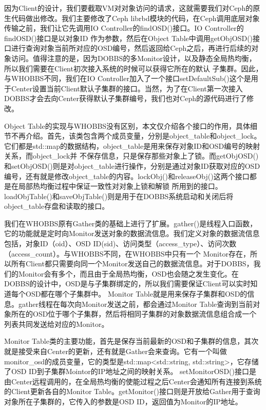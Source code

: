因为Client的设计，我们要截取VM对对象访问的请求，这就需要我们对Ceph的原生代码做出修改。我们主要修改了Ceph librbd模块的代码，在Ceph调用底层对象传输之前，我们让它先调用IO Controller的findOSD()接口。IO Controller的findOSD()接口是以对象ID
作为参数，然后在Object Table中调用getObjOSD()接口进行查询对象当前所对应的OSD编号，然后返回给Ceph之后，再进行后续的对象访问。值得注意的是，因为DOBBS的多Monitor设计，以及静态全局热均衡，所以我们需要在Client初次接入系统的时候可以获得它所在的默认
子集群。因此，与WHOBBS不同，我们在IO Controller加入了一个接口setDefaultSub()这个是用于Center设置当前Client默认子集群的接口。当然，为了在Client第一次接入DOBBS才会去向Center获得默认子集群编号，我们也对Ceph的源代码进行了修改。

Object Table的实现与WHOBBS没有区别，本文仅介绍各个接口的作用，具体细节不再介绍。首先，该类包含两个成员变量，分别是object\_table和object\_lock。它们都是std::map的数据结构，object\_table是用来保存对象ID和OSD编号的映射关系，而object\_lock并
不保存信息，只是保存那些对象上了锁。而getObjOSD()和setObjOSD()则是对object\_table进行操作，分别是通过对象ID获取对应的OSD编号，还有就是修改object\_table的内容。lockObj()和releaseObj()这两个接口都是在局部热均衡过程中保证一致性对对象上锁和解锁
所用到的接口。loadObjTable()和saveObjTable()则是用于在DOBBS系统启动和关闭后将object\_table存盘和读取的接口。

我们在WHOBBS原有Gather类的基础上进行了扩展。gather()是线程入口函数，它的功能就是定时向Monitor发送对象的数据流信息。我们定义对象的数据流信息包括，对象ID（oid）、OSD ID(sid)、访问类型（access\_type）、访问次数（access\_count）。与WHOBBS不同，在WHOBBS中只有一个
Monitor存在，所以所有Client都只需要向同一个Monitor发送自己的数据流信息。对于DOBBS，我们的Monitor会有多个，而且由于全局热均衡，OSD也会随之发生变化。在DOBBS的设计中，OSD是与子集群绑定的，所以我们需要保证Client可以实时知道每个OSD都在哪个子集群中。
Monitor Table就是用来保存子集群和OSD的信息。gather线程在每次向Monitor发送之前，都会通过Monitor Table查询到当前对象所在的OSD位于哪个子集群，然后将相同子集群的对象数据流信息组合成一个列表共同发送给对应的Monitor。

Monitor Table类的主要功能，首先是保存当前最新的OSD和子集群的信息，其次就是接受来自Center的更新，还有就是Gather会来查询。它有一个叫做monitor\_osd的成员变量，它的类型是std::map<std::string, std::string>，它存储了OSD ID到子集群Mointor的IP地址之间的映射关系。
setMonitorOSD()接口是由Center远程调用的，在全局热均衡的使能过程之后Center会通知所有连接到系统的Client更新各自的Monitor Table。getMonitor()接口则是开放给Gather用于查询对象所在子集群的，它传入的参数是OSD ID，返回值为Monitor的IP地址。

